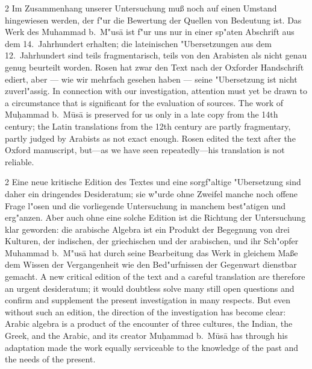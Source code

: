 \documentclass[10pt,a4paper]{article}
\renewcommand{\switchcolumn}{\syncronize\nointerlineskip\columnbreak}
\begin{document}
\begin{paracol}{2}
Im Zusammenhang unserer Untersuchung mu\ss{} noch auf einen Umstand hingewiesen werden, der f"ur die Bewertung der Quellen von Bedeutung ist. Das Werk des Muhammad b.\ M"us\=a ist f"ur uns nur in einer sp"aten Abschrift aus dem 14.\ Jahrhundert erhalten; die lateinischen "Ubersetzungen aus dem 12.\ Jahrhundert sind teils fragmentarisch, teils von den Arabisten als nicht genau genug beurteilt worden. Rosen hat zwar den Text nach der Oxforder Handschrift ediert, aber --- wie wir mehrfach gesehen haben --- seine "Ubersetzung ist nicht zuverl"assig.
\switchcolumn
In connection with our investigation, attention must yet be drawn to a circumstance that is significant for the evaluation of sources. The work of Mu\d{h}ammad b.\ M\=us\=a is preserved for us only in a late copy from the 14th century; the Latin translations from the 12th century are partly fragmentary, partly judged by Arabists as not exact enough. Rosen edited the text after the Oxford manuscript, but---as we have seen repeatedly---his translation is not reliable.
\end{paracol}

\begin{paracol}{2}
Eine neue kritische Edition des Textes und eine sorgf"altige "Ubersetzung sind daher ein dringendes Desideratum; sie w"urde ohne Zweifel manche noch offene Frage l"osen und die vorliegende Untersuchung in manchem best"atigen und erg"anzen. Aber auch ohne eine solche Edition ist die Richtung der Untersuchung klar geworden: die arabische Algebra ist ein Produkt der Begegnung von drei Kulturen, der indischen, der griechischen und der arabischen, und ihr Sch"opfer Muhammad b.\ M"us\=a hat durch seine Bearbeitung das Werk in gleichem Ma\ss{}e dem Wissen der Vergangenheit wie den Bed"urfnissen der Gegenwart dienstbar gemacht.
\switchcolumn
A new critical edition of the text and a careful translation are therefore an urgent desideratum; it would doubtless solve many still open questions and confirm and supplement the present investigation in many respects. But even without such an edition, the direction of the investigation has become clear: Arabic algebra is a product of the encounter of three cultures, the Indian, the Greek, and the Arabic, and its creator Mu\d{h}ammad b.\ M\=us\=a has through his adaptation made the work equally serviceable to the knowledge of the past and the needs of the present.
\end{paracol}
\clearpage

\end{document}
